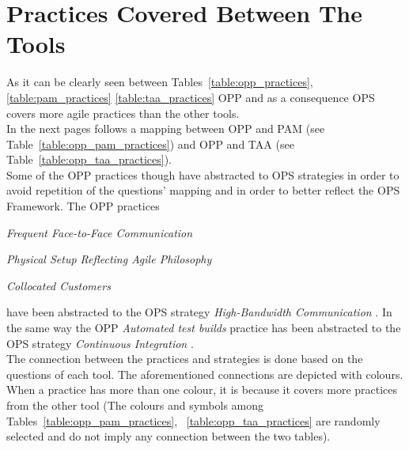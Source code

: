 \section[Tool Practices]{Practices Covered Between The Tools}

As it can be clearly seen between Tables~\ref{table:opp_practices}, \ref{table:pam_practices} \ref{table:taa_practices} OPP and as a consequence OPS covers more agile practices than the other tools. \\

In the next pages follows a mapping between OPP and PAM (see Table~\ref{table:opp_pam_practices}) and OPP and TAA (see Table~\ref{table:opp_taa_practices}). \\

Some of the OPP practices though have abstracted to OPS strategies in order to avoid repetition of the questions' mapping and in order to better reflect the OPS Framework. The OPP practices \begin{inparaenum} [a\upshape)]
	\item \textit{Frequent Face-to-Face Communication}
	\item \textit{Physical Setup Reflecting Agile Philosophy}
	\item \textit{Collocated Customers}
\end{inparaenum} have been abstracted to the OPS strategy \textit{High-Bandwidth Communication}  \cite[p. 57]{sventha_dissertation}. In the same way the OPP \textit{Automated test builds} practice has been abstracted to the OPS strategy \textit{Continuous Integration} \cite[p. 57]{sventha_dissertation}. \\

The connection between the practices and strategies is done based on the questions of each tool. The aforementioned connections are depicted with colours. When a practice has more than one colour, it is because it covers more practices from the other tool (The colours and symbols among Tables~\ref{table:opp_pam_practices}, ~\ref{table:opp_taa_practices} are randomly selected and do not imply any connection between the two tables). \\


